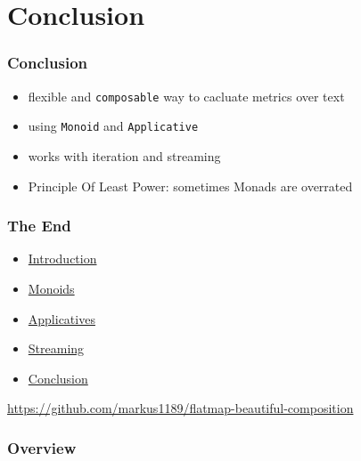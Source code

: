 \documentclass[aspectratio=169]{beamer}
\begin{document}
\section{Conclusion}\label{sec:conclusion}

\begin{frame}
  \frametitle{Conclusion}
  \begin{itemize}
  \item flexible and \texttt{composable} way to cacluate metrics over text
  \item using \texttt{Monoid} and \texttt{Applicative}
  \item works with iteration and streaming
  \item Principle Of Least Power: sometimes Monads are overrated
  \end{itemize}
\end{frame}

\begin{frame}
  \frametitle{The End}
  \begin{itemize}
  \item \hyperref[sec:introduction]{Introduction}
  \item \hyperref[sec:monoids]{Monoids}
  \item \hyperref[sec:applicatives]{Applicatives}
  \item \hyperref[sec:streaming]{Streaming}
  \item \hyperref[sec:conclusion]{Conclusion}
  \end{itemize}
  \vfill
  \begin{center}
    \url{https://github.com/markus1189/flatmap-beautiful-composition}
  \end{center}
\end{frame}

\appendix{}

\begin{frame}
  \frametitle{Overview}
  \def\firstcircle{(0,0) ellipse (20mm and 5mm)}
  \def\secondcircle{(0,0) ellipse (25mm and 12mm)}
  \def\thirdcircle{(0,0) ellipse (35mm and 20mm)}
  \begin{center}
  \end{center}
\end{frame}
\end{document}
